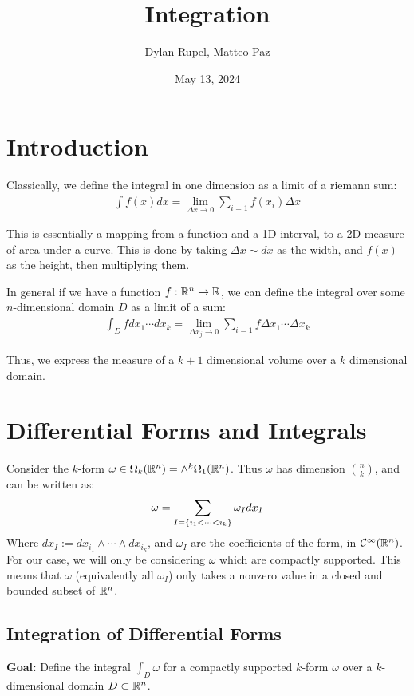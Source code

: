 \documentclass{article}
\author{Dylan Rupel, Matteo Paz}
\date{May 13, 2024}
\title{Integration}
\begin{document}
\maketitle

\section*{Introduction}
Classically, we define the integral in one dimension as a limit of a riemann sum:
\begin{align}
    \int f(x) dx = \lim\limits_{\Delta x \to 0} \sum_{i=1} f(x_i) \Delta x
\end{align}

This is essentially a mapping from a function and a 1D interval, to a 2D measure of area under a curve. This is done by taking $\Delta x \sim dx$ as the width, and $f(x)$ as the height, then multiplying them. \vspace{1em}

In general if we have a function $f: \mathbb{R}^n \to \mathbb{R}$, we can define the integral over some $n$-dimensional domain $D$ as a limit of a sum:
\begin{align}
    \int_D f dx_1 \cdots dx_k = \lim\limits_{\Delta x_j \to 0} \sum_{i=1} f \Delta x_1 \cdots \Delta x_k
\end{align}

Thus, we express the measure of a $k+1$ dimensional volume over a $k$ dimensional domain.

\section*{Differential Forms and Integrals}
Consider the $k$-form $\omega \in \Omega_k(\mathbb{R}^n) = \wedge^k\Omega_1(\mathbb{R}^n)$. Thus $\omega$ has dimension ${n \choose k}$, and can be written as:
\[\omega = \sum\limits_{I = \left\{i_1 < \cdots < i_k\right\}} \omega_I dx_I\]
Where $dx_I := dx_{i_1} \wedge \cdots \wedge dx_{i_k}$, and $\omega_I$ are the coefficients of the form, in $\mathcal{C}^\infty (\mathbb{R}^n)$. For our case, we will only be considering $\omega$ which are compactly supported. This means that $\omega$ (equivalently all $\omega_I$) only takes a nonzero value in a closed and bounded subset of $\mathbb{R}^n$. \vspace{1em}

\subsection*{Integration of Differential Forms}
\textbf{Goal:} Define the integral $\int_D \omega$ for a compactly supported $k$-form $\omega$ over a $k$-dimensional domain $D \subset \mathbb{R}^n$.
\end{document}
